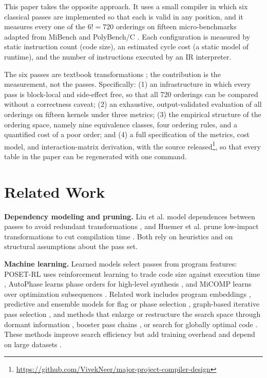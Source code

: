 \documentclass[conference,a4paper]{IEEEtran}
\begin{document}
This paper takes the opposite approach. It uses a small compiler in which six classical passes are implemented so that each is valid in any position, and it measures every one of the $6! = 720$ orderings on fifteen micro-benchmarks adapted from MiBench \cite{ref32} and PolyBench/C \cite{ref31}. Each configuration is measured by static instruction count (code size), an estimated cycle cost (a static model of runtime), and the number of instructions executed by an IR interpreter.

The six passes are textbook transformations \cite{ref18,ref21}; the contribution is the measurement, not the passes. Specifically: (1) an infrastructure in which every pass is block-local and side-effect free, so that all 720 orderings can be compared without a correctness caveat; (2) an exhaustive, output-validated evaluation of all orderings on fifteen kernels under three metrics; (3) the empirical structure of the ordering space, namely nine equivalence classes, four ordering rules, and a quantified cost of a poor order; and (4) a full specification of the metrics, cost model, and interaction-matrix derivation, with the source released\footnote{\url{https://github.com/VivekNeer/major-project-compiler-design}}, so that every table in the paper can be regenerated with one command.

\section{Related Work}

\textbf{Dependency modeling and pruning.} Liu et al. model dependences between passes to avoid redundant transformations \cite{ref1}, and Huemer et al. prune low-impact transformations to cut compilation time \cite{ref4}. Both rely on heuristics and on structural assumptions about the pass set.

\textbf{Machine learning.} Learned models select passes from program features: POSET-RL uses reinforcement learning to trade code size against execution time \cite{ref8}, AutoPhase learns phase orders for high-level synthesis \cite{ref12}, and MiCOMP learns over optimization subsequences \cite{ref15}. Related work includes program embeddings \cite{ref9}, predictive and ensemble models for flag or phase selection \cite{ref17,ref22,ref28,ref29}, graph-based iterative pass selection \cite{ref20}, and methods that enlarge or restructure the search space through dormant information \cite{ref2,ref26}, booster pass chains \cite{ref25}, or search for globally optimal code \cite{ref3}. These methods improve search efficiency but add training overhead and depend on large datasets \cite{ref8,ref12,ref15}.
\end{document}
